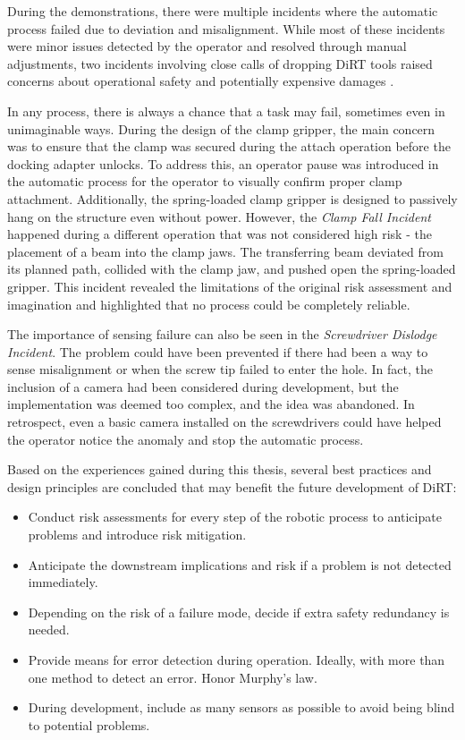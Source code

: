 During the demonstrations, there were multiple incidents where the automatic process failed due to deviation and misalignment. While most of these incidents were minor issues detected by the operator and resolved through manual adjustments, two incidents involving close calls of dropping DiRT tools raised concerns about operational safety and potentially expensive damages .

In any process, there is always a chance that a task may fail, sometimes even in unimaginable ways. During the design of the clamp gripper, the main concern was to ensure that the clamp was secured during the attach operation before the docking adapter unlocks. To address this, an operator pause was introduced in the automatic process for the operator to visually confirm proper clamp attachment. Additionally, the spring-loaded clamp gripper is designed to passively hang on the structure even without power. However, the \textit{Clamp Fall Incident} happened during a different operation that was not considered high risk - the placement of a beam into the clamp jaws. The transferring beam deviated from its planned path, collided with the clamp jaw, and pushed open the spring-loaded gripper. This incident revealed the limitations of the original risk assessment and imagination and highlighted that no process could be completely reliable.

The importance of sensing failure can also be seen in the \textit{Screwdriver Dislodge Incident}. The problem could have been prevented if there had been a way to sense misalignment or when the screw tip failed to enter the hole. In fact, the inclusion of a camera had been considered during development, but the implementation was deemed too complex, and the idea was abandoned. In retrospect, even a basic camera installed on the screwdrivers could have helped the operator notice the anomaly and stop the automatic process. 

Based on the experiences gained during this thesis, several best practices and design principles are concluded that may benefit the future development of DiRT:

\begin{itemize}
	\item Conduct risk assessments for every step of the robotic process to anticipate problems and introduce risk mitigation.

	\item Anticipate the downstream implications and risk if a problem is not detected immediately. 

	\item Depending on the risk of a failure mode, decide if extra safety redundancy is needed.

	\item Provide means for error detection during operation. Ideally, with more than one method to detect an error. Honor Murphy's law.

	\item During development, include as many sensors as possible to avoid being blind to potential problems.

\end{itemize}

